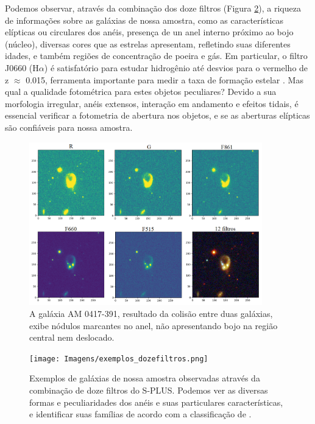 Podemos observar, através da combinação dos doze filtros (Figura \ref{fig:exemplos_dozefiltros}), a riqueza de informações sobre as galáxias de nossa amostra, como as características elípticas ou circulares dos anéis, presença de un anel interno próximo ao bojo (núcleo), diversas cores que as estrelas apresentam, refletindo suas diferentes idades, e também regiões de concentração de poeira e gás. Em particular, o filtro J0660 (H$\alpha$) é satisfatório para estudar hidrogênio até desvios para o vermelho de z $\approx$ 0.015, ferramenta importante para medir a taxa de formação estelar \cite{2022MNRAS.511.4590A}. Mas qual a qualidade fotométrica para estes objetos peculiares? Devido a sua morfologia irregular, anéis extensos, interação em andamento e efeitos tidais, é essencial verificar a fotometria de abertura nos objetos, e se as aberturas elípticas são confiáveis para nossa amostra.

\begin{figure}[!h]
  \centering 
  \includegraphics[width=0.9\textwidth]{Imagens/am0417391.png}
  \caption[Filtros individuais e combinados de AM 0417-391.]{A galáxia AM 0417-391, resultado da colisão entre duas galáxias, exibe nódulos marcantes no anel, não apresentando bojo na região central nem deslocado.}
  \label{fig:am0417391}
\end{figure}

\begin{figure}[!h]
  \centering 
  \texttt{[image: Imagens/exemplos\_dozefiltros.png]} 
  \caption[Exemplos de galáxias aneladas peculiares pela combinação de doze filtros do S-PLUS.]{Exemplos de galáxias de nossa amostra observadas através da combinação de doze filtros do S-PLUS. Podemos ver as diversas formas e peculiaridades dos anéis e suas particulares características, e identificar suas famílias de acordo com a classificação de .}
  \label{fig:exemplos_dozefiltros} 
\end{figure}


